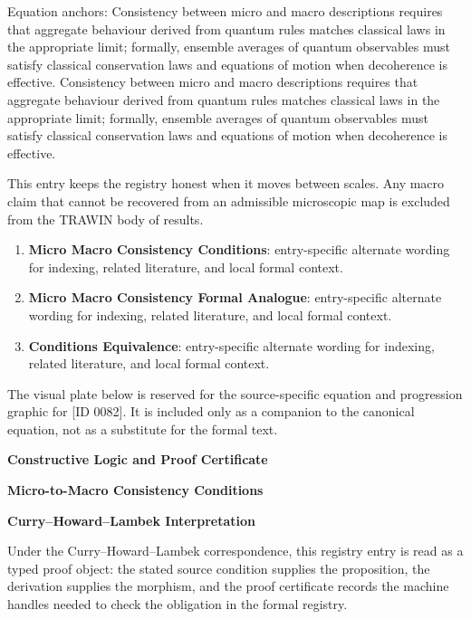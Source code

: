 Equation anchors: Consistency between micro and macro descriptions requires that aggregate behaviour derived from quantum rules matches classical laws in the appropriate limit; formally, ensemble averages of quantum observables must satisfy classical conservation laws and equations of motion when decoherence is effective. Consistency between micro and macro descriptions requires that aggregate behaviour derived from quantum rules matches classical laws in the appropriate limit; formally, ensemble averages of quantum observables must satisfy classical conservation laws and equations of motion when decoherence is effective.

This entry keeps the registry honest when it moves between scales. Any macro claim that cannot be recovered from an admissible microscopic map is excluded from the TRAWIN body of results.
\endgroup

\begingroup\footnotesize\sloppy
\begin{enumerate}[leftmargin=1.35em,itemsep=1pt,topsep=1pt,parsep=0pt]
\item \textbf{Micro Macro Consistency Conditions}: entry-specific alternate wording for indexing, related literature, and local formal context.
\item \textbf{Micro Macro Consistency Formal Analogue}: entry-specific alternate wording for indexing, related literature, and local formal context.
\item \textbf{Conditions Equivalence}: entry-specific alternate wording for indexing, related literature, and local formal context.
\end{enumerate}
\endgroup

\begingroup\footnotesize\sloppy
The visual plate below is reserved for the source-specific equation and progression graphic for [ID 0082]. It is included only as a companion to the canonical equation, not as a substitute for the formal text.
\par\endgroup
\ifTZPDarkEdition
{}
\fi

\clearpage
\begingroup\tzpsupportsetup
\noindent\textbf{\fontsize{10.8pt}{12.8pt}\selectfont [ID 0082] Constructive Logic and Proof Certificate}\par
\noindent\textbf{\fontsize{10pt}{12pt}\selectfont Micro-to-Macro Consistency Conditions}\par
\vspace{0.45em}
\begingroup
\footnotesize
\setlength{\parskip}{0.22em}
\setlength{\parindent}{0pt}
\noindent\textbf{Curry--Howard--Lambek Interpretation}\par
Under the Curry--Howard--Lambek correspondence, this registry entry is read as a typed proof
object: the stated source condition supplies the proposition, the derivation supplies the
morphism, and the proof certificate records the machine handles needed to check the obligation
in the formal registry.

